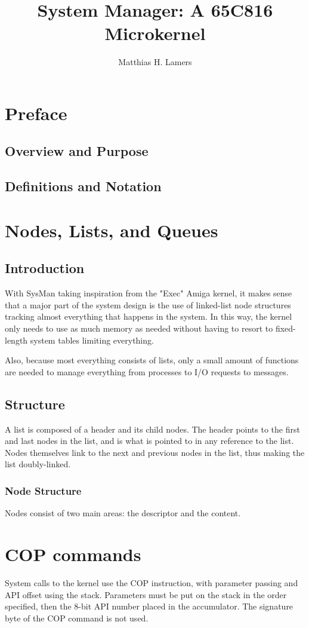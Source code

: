 \documentclass{memoir}
\title{System Manager: A 65C816 Microkernel}
\author{Matthias H. Lamers}
\begin{document}
	\frontmatter
	\maketitle
	
	\tableofcontents
	
	\chapter{Preface}
	\section{Overview and Purpose}
	
	\section{Definitions and Notation}
	
	\mainmatter
	\chapter{Nodes, Lists, and Queues}
	\section{Introduction}
	With SysMan taking inspiration from the "Exec" Amiga kernel, it makes sense that a major part of the system design is the use of linked-list node structures tracking almost everything that happens in the system. In this way, the kernel only needs to use as much memory as needed without having to resort to fixed-length system tables limiting everything.
	
	Also, because most everything consists of lists, only a small amount of functions are needed to manage everything from processes to I/O requests to messages.
	\section{Structure}
	A list is composed of a header and its child nodes. The header points to the first and last nodes in the list, and is what is pointed to in any reference to the list. Nodes themselves link to the next and previous nodes in the list, thus making the list doubly-linked. 
	
	\subsection{Node Structure}
	Nodes consist of two main areas: the descriptor and the content.
	
	\appendix
	\chapter{COP commands}
	System calls to the kernel use the COP instruction, with parameter passing and API offset using the stack. Parameters must be put on the stack in the order specified, then the 8-bit API number placed in the accumulator. The signature byte of the COP command is not used.
	
\end{document}
